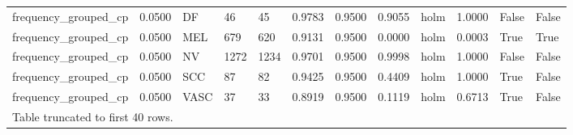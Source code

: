 \begin{table}[htbp]
\begin{tabular}{llllllllllll}
frequency\_grouped\_cp & 0.0500 & DF & 46 & 45 & 0.9783 & 0.9500 & 0.9055 & holm & 1.0000 & False & False \\
frequency\_grouped\_cp & 0.0500 & MEL & 679 & 620 & 0.9131 & 0.9500 & 0.0000 & holm & 0.0003 & True & True \\
frequency\_grouped\_cp & 0.0500 & NV & 1272 & 1234 & 0.9701 & 0.9500 & 0.9998 & holm & 1.0000 & False & False \\
frequency\_grouped\_cp & 0.0500 & SCC & 87 & 82 & 0.9425 & 0.9500 & 0.4409 & holm & 1.0000 & True & False \\
frequency\_grouped\_cp & 0.0500 & VASC & 37 & 33 & 0.8919 & 0.9500 & 0.1119 & holm & 0.6713 & True & False \\
\multicolumn{12}{l}{Table truncated to first 40 rows.} \\
\hline
\end{tabular}
\end{table}
